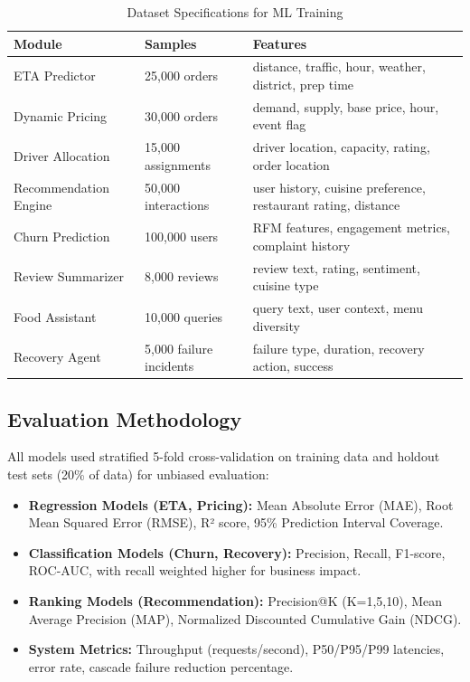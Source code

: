 \documentclass[12pt,a4paper]{report}
\begin{document}
\begin{itemize}
\begin{table}[H]
\centering
\caption{Dataset Specifications for ML Training}
\begin{tabular}{p{3cm} p{2cm} p{4.5cm}}
\toprule
\textbf{Module} & \textbf{Samples} & \textbf{Features} \\
\midrule
ETA Predictor & 25,000 orders & distance, traffic, hour, weather, district, prep time \\
Dynamic Pricing & 30,000 orders & demand, supply, base price, hour, event flag \\
Driver Allocation & 15,000 assignments & driver location, capacity, rating, order location \\
Recommendation Engine & 50,000 interactions & user history, cuisine preference, restaurant rating, distance \\
Churn Prediction & 100,000 users & RFM features, engagement metrics, complaint history \\
Review Summarizer & 8,000 reviews & review text, rating, sentiment, cuisine type \\
Food Assistant & 10,000 queries & query text, user context, menu diversity \\
Recovery Agent & 5,000 failure incidents & failure type, duration, recovery action, success \\
\bottomrule
\end{tabular}
\end{table}

\subsection{Evaluation Methodology}

All models used stratified 5-fold cross-validation on training data and holdout test sets (20\% of data) for unbiased evaluation:

\begin{itemize}
    \item \textbf{Regression Models (ETA, Pricing):} Mean Absolute Error (MAE), Root Mean Squared Error (RMSE), R² score, 95\% Prediction Interval Coverage.
    \item \textbf{Classification Models (Churn, Recovery):} Precision, Recall, F1-score, ROC-AUC, with recall weighted higher for business impact.
    \item \textbf{Ranking Models (Recommendation):} Precision@K (K=1,5,10), Mean Average Precision (MAP), Normalized Discounted Cumulative Gain (NDCG).
    \item \textbf{System Metrics:} Throughput (requests/second), P50/P95/P99 latencies, error rate, cascade failure reduction percentage.
\end{itemize}


\end{itemize}
\end{document}
